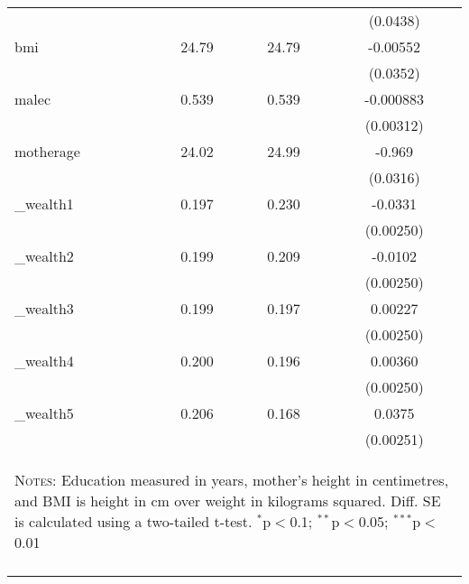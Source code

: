 \begin{table}[htbp]
\begin{tabular}{l*{1}{ccc}}
            &            &            &    (0.0438)         \\
bmi         &       24.79&       24.79&    -0.00552         \\
            &            &            &    (0.0352)         \\
malec       &       0.539&       0.539&   -0.000883         \\
            &            &            &   (0.00312)         \\
motherage   &       24.02&       24.99&      -0.969\sym{***}\\
            &            &            &    (0.0316)         \\
\_wealth1    &       0.197&       0.230&     -0.0331\sym{***}\\
            &            &            &   (0.00250)         \\
\_wealth2    &       0.199&       0.209&     -0.0102\sym{***}\\
            &            &            &   (0.00250)         \\
\_wealth3    &       0.199&       0.197&     0.00227         \\
            &            &            &   (0.00250)         \\
\_wealth4    &       0.200&       0.196&     0.00360         \\
            &            &            &   (0.00250)         \\
\_wealth5    &       0.206&       0.168&      0.0375\sym{***}\\
            &            &            &   (0.00251)         \\
\midrule\midrule


\multicolumn{4}{p{10.4cm}}{\begin{footnotesize}\textsc{Notes:} 
Education measured in years, mother's height in centimetres, and BMI is 
height in cm over weight in kilograms squared.  Diff. SE is calculated using 
a two-tailed t-test. $^{*}$p$<$0.1; $^{**}$p$<$0.05; $^{***}$p$<$0.01\end{footnotesize}}  
\\ \bottomrule \normalsize\end{tabular}\end{table} 
